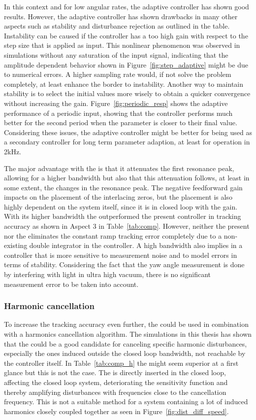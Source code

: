 In this context and for low angular rates, the adaptive controller has shown good results. However, the adaptive controller has shown drawbacks in many other aspects such as stability and disturbance rejection as outlined in the table. Instability can be caused if the controller has a too high gain with respect to the step size that is applied as input. This nonlinear phenomenon was observed in simulations without any saturation of the input signal, indicating that the amplitude dependent behavior shown in Figure~\ref{fig:step_adaptive} might be due to numerical errors. A higher sampling rate would, if not solve the problem completely, at least enhance the border to instability. Another way to maintain stability is to select the initial values more wisely to obtain a quicker convergence without increasing the gain. Figure~\ref{fig:periodic_resp} shows the adaptive performance of a periodic input, showing that the controller performs much better for the second period when the parameter is closer to their final value. Considering these issues, the adaptive controller might be better for being used as a secondary controller for long term parameter adaption, at least for operation in 2kHz.

The major advantage with the \abbrIRC is that it attenuates the first resonance peak, allowing for a higher bandwidth but also that this attenuation follows, at least in some extent, the changes in the resonance peak. The negative feedforward gain impacts on the placement of the interlacing zeros, but the placement is also highly dependent on the system itself, since it is in closed loop with the gain. With its higher bandwidth the \abbrIRC outperformed the present controller in tracking accuracy as shown in Aspect 3 in Table~\ref{tab:comp}. However, neither the present nor the \abbrIRC eliminates the constant ramp tracking error completely due to a non-existing double integrator in the controller. A high bandwidth also implies in a controller that is more sensitive to measurement noise and to model errors in terms of stability. Considering the fact that the yaw angle measurement is done by interfering with light in ultra high vacuum, there is no significant measurement error to be taken into account.

\subsubsection{Harmonic cancellation}
To increase the tracking accuracy even further, the \abbrIRC could be used in combination with a harmonics cancellation algorithm. The simulations in this thesis has shown that the \abbrRFDC could be a good candidate for canceling specific harmonic disturbances, especially the ones induced outside the closed loop bandwidth, not reachable by the controller itself. In Table~\ref{tab:comp_h} the \abbrIMP might seem superior at a first glance but this is not the case. The \abbrIMP is directly inserted in the closed loop, affecting the closed loop system, deteriorating the sensitivity function and thereby amplifying disturbances with frequencies close to the cancellation frequency. This is not a suitable method for a system containing a lot of induced harmonics closely coupled together as seen in Figure~\ref{fig:dist_diff_speed}.

